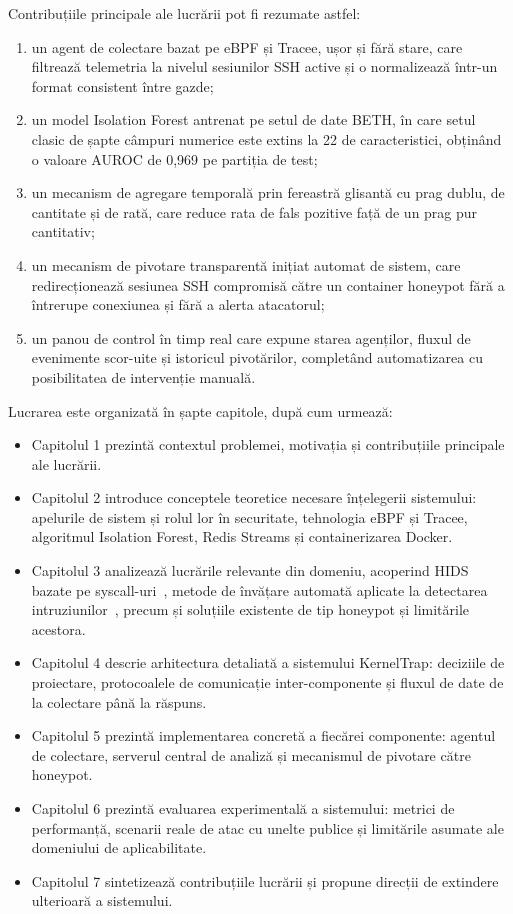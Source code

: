 \documentclass[12pt, a4paper]{report}
\begin{document}
Contribuțiile principale ale lucrării pot fi rezumate astfel:

\begin{enumerate}
  \item un agent de colectare bazat pe eBPF și Tracee, ușor și fără stare, care
    filtrează telemetria la nivelul sesiunilor SSH active și o normalizează
    într-un format consistent între gazde;
  \item un model Isolation Forest antrenat pe setul de date BETH, în care setul
    clasic de șapte câmpuri numerice este extins la 22 de caracteristici,
    obținând o valoare AUROC de 0,969 pe partiția de test;
  \item un mecanism de agregare temporală prin fereastră glisantă cu prag dublu,
    de cantitate și de rată, care reduce rata de fals pozitive față de un prag
    pur cantitativ;
  \item un mecanism de pivotare transparentă inițiat automat de sistem, care
    redirecționează sesiunea SSH compromisă către un container honeypot fără a
    întrerupe conexiunea și fără a alerta atacatorul;
  \item un panou de control în timp real care expune starea agenților, fluxul de
    evenimente scor-uite și istoricul pivotărilor, completând automatizarea cu
    posibilitatea de intervenție manuală.
\end{enumerate}

Lucrarea este organizată în șapte capitole, după cum urmează:

\begin{itemize}
  \item Capitolul 1 prezintă contextul problemei, motivația și contribuțiile
    principale ale lucrării.
  \item Capitolul 2 introduce conceptele teoretice necesare înțelegerii
    sistemului: apelurile de sistem și rolul lor în securitate, tehnologia eBPF
    și Tracee, algoritmul Isolation Forest, Redis Streams și containerizarea
    Docker.
  \item Capitolul 3 analizează lucrările relevante din domeniu, acoperind HIDS
    bazate pe syscall-uri~\cite{liu2018hids}, metode de învățare automată
    aplicate la detectarea intruziunilor~\cite{ring2021deep}, precum și
    soluțiile existente de tip honeypot și limitările acestora.
  \item Capitolul 4 descrie arhitectura detaliată a sistemului KernelTrap:
    deciziile de proiectare, protocoalele de comunicație inter-componente și
    fluxul de date de la colectare până la răspuns.
  \item Capitolul 5 prezintă implementarea concretă a fiecărei componente:
    agentul de colectare, serverul central de analiză și mecanismul de pivotare
    către honeypot.
  \item Capitolul 6 prezintă evaluarea experimentală a sistemului: metrici de
    performanță, scenarii reale de atac cu unelte publice și limitările asumate
    ale domeniului de aplicabilitate.
  \item Capitolul 7 sintetizează contribuțiile lucrării și propune direcții de
    extindere ulterioară a sistemului.
\end{itemize}
\end{document}
